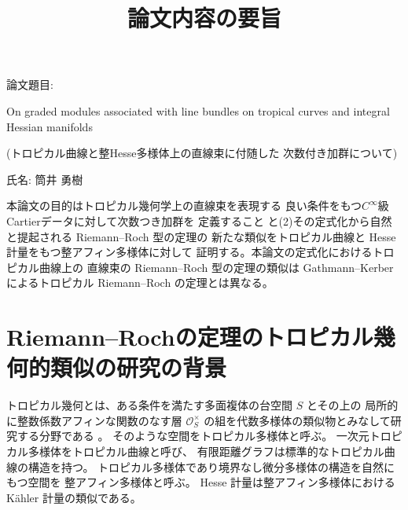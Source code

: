 \documentclass[uplatex,dvipdfmx,12pt]{jsarticle}
\title{論文内容の要旨
}
\date{}
\numberwithin{equation}{section}
\theoremstyle{definition}
\newcommand{\beforesection}{\vspace{-20pt}}
\newcommand{\aftersection}{\vspace{-10pt}}
\begin{document}
\setlength{\baselineskip}{-5pt}
\setlength{\parskip}{2pt}

\maketitle
{\large
\noindent
論文題目:

On graded modules associated with line bundles on 
tropical curves and integral Hessian manifolds

(トロピカル曲線と整Hesse多様体上の直線束に付随した
次数付き加群について)
}

\vspace{5pt}

\noindent
{\large
氏名: 筒井 勇樹
}

\vspace{10pt}

\setlength{\baselineskip}{-3pt}
\setlength{\parskip}{2pt}

本論文の目的はトロピカル幾何学上の直線束を表現する
良い条件をもつ$C^{\infty}$級Cartierデータに対して次数つき加群を
定義すること
と(2)その定式化から自然と提起される Riemann--Roch 型の定理の
新たな類似をトロピカル曲線と Hesse 計量をもつ整アフィン多様体に対して
証明する。本論文の定式化におけるトロピカル曲線上の
直線束の Riemann--Roch 型の定理の類似は Gathmann--Kerber
によるトロピカル Riemann--Roch の定理とは異なる。

\beforesection

\section{Riemann--Rochの定理のトロピカル幾何的類似の研究の背景}

\aftersection

トロピカル幾何とは、ある条件を満たす多面複体の台空間 $S$ とその上の
局所的に整数係数アフィンな関数のなす層 
$\mathcal{O}_S^{\times}$
の組を代数多様体の類似物とみなして研究する分野である
\cite{mikhalkinTropicalEigenwaveIntermediate2014a,
gross2019sheaftheoretic}。
そのような空間をトロピカル多様体と呼ぶ。
一次元トロピカル多様体をトロピカル曲線と呼び、
有限距離グラフは標準的なトロピカル曲線の構造を持つ。
トロピカル多様体であり境界なし微分多様体の構造を自然にもつ空間を
整アフィン多様体と呼ぶ。
Hesse 計量は整アフィン多様体における
K\"ahler 計量の類似である。
\end{document}
